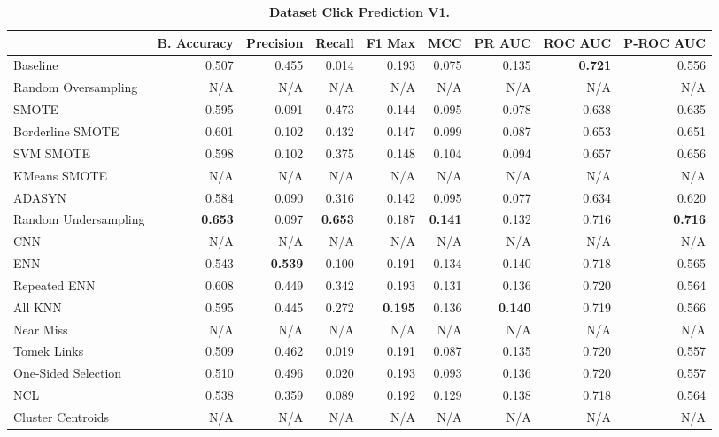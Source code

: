\begin{table}[H]
    \centering
    \setlength\tabcolsep{2pt}
    \begin{tabularx}{\textwidth}{lRRRRRRRR}
        & B. Accuracy & Precision & Recall & F1 Max & MCC & PR AUC & ROC AUC & P-ROC AUC \\
        \midrule
        Baseline & 0.507 & 0.455 & 0.014 & 0.193 & 0.075 & 0.135 & \textbf{0.721} & 0.556 \\
        Random Oversampling & N/A & N/A & N/A & N/A & N/A & N/A & N/A & N/A \\
        SMOTE & 0.595 & 0.091 & 0.473 & 0.144 & 0.095 & 0.078 & 0.638 & 0.635 \\
        Borderline SMOTE & 0.601 & 0.102 & 0.432 & 0.147 & 0.099 & 0.087 & 0.653 & 0.651 \\
        SVM SMOTE & 0.598 & 0.102 & 0.375 & 0.148 & 0.104 & 0.094 & 0.657 & 0.656 \\
        KMeans SMOTE & N/A & N/A & N/A & N/A & N/A & N/A & N/A & N/A \\
        ADASYN & 0.584 & 0.090 & 0.316 & 0.142 & 0.095 & 0.077 & 0.634 & 0.620 \\
        Random Undersampling & \textbf{0.653} & 0.097 & \textbf{0.653} & 0.187 & \textbf{0.141} & 0.132 & 0.716 & \textbf{0.716} \\
        CNN & N/A & N/A & N/A & N/A & N/A & N/A & N/A & N/A \\
        ENN & 0.543 & \textbf{0.539} & 0.100 & 0.191 & 0.134 & 0.140 & 0.718 & 0.565 \\
        Repeated ENN & 0.608 & 0.449 & 0.342 & 0.193 & 0.131 & 0.136 & 0.720 & 0.564 \\
        All KNN & 0.595 & 0.445 & 0.272 & \textbf{0.195} & 0.136 & \textbf{0.140} & 0.719 & 0.566 \\
        Near Miss & N/A & N/A & N/A & N/A & N/A & N/A & N/A & N/A \\
        Tomek Links & 0.509 & 0.462 & 0.019 & 0.191 & 0.087 & 0.135 & 0.720 & 0.557 \\
        One-Sided Selection & 0.510 & 0.496 & 0.020 & 0.193 & 0.093 & 0.136 & 0.720 & 0.557 \\
        NCL & 0.538 & 0.359 & 0.089 & 0.192 & 0.129 & 0.138 & 0.718 & 0.564 \\
        Cluster Centroids & N/A & N/A & N/A & N/A & N/A & N/A & N/A & N/A \\
    \end{tabularx}
    \vspace{1mm}
    \caption{\textbf{Dataset Click Prediction V1.}}
\end{table}
